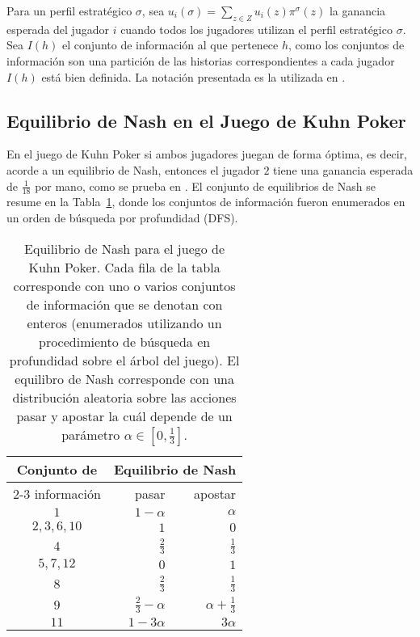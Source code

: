 Para un perfil estratégico $\sigma$, sea $u_i(\sigma) = \sum_{z \in Z} u_i(z)\pi^{\sigma}(z)$ la ganancia esperada del jugador $i$ cuando todos los jugadores utilizan el perfil estratégico $\sigma$. Sea $I(h)$ el conjunto de información al que pertenece $h$, como los conjuntos de información son una partición de las historias correspondientes a cada jugador $I(h)$ está bien definida. La notación presentada es la utilizada en \cite{bib:cfr}.

\subsection*{Equilibrio de Nash en el Juego de Kuhn Poker}

En el juego de Kuhn Poker si ambos jugadores juegan de forma óptima, es decir, acorde a un equilibrio de Nash, entonces el jugador $2$ tiene una ganancia esperada de $\frac{1}{18}$ por mano, como se prueba en \cite{bib:kuhn-poker}. El conjunto de equilibrios de Nash se resume en la Tabla~\ref{tab:estrategia-kuhn-poker}, donde los conjuntos de información fueron enumerados en un orden de búsqueda por profundidad (DFS).

\begin{table}[h]
\begin{center}
    \caption{Equilibrio de Nash para el juego de Kuhn Poker. Cada fila de la tabla corresponde con uno o varios conjuntos de información que se denotan con enteros (enumerados utilizando un procedimiento de búsqueda en profundidad sobre el árbol del juego). El equilibro de Nash corresponde con una distribución aleatoria sobre las acciones pasar y apostar la cuál depende de un parámetro $\alpha \in \left[ 0,\frac{1}{3} \right]$.}
    \label{tab:estrategia-kuhn-poker}
    \begin{tabular}{c r r}
        \toprule
        \multirow{2}{*}{Conjunto de} & \multicolumn{2}{c}{Equilibrio de Nash}  \\ \cmidrule(l){2-3}
        información & pasar & apostar \\ 
        \midrule
         $1$ & $1-\alpha$ & $\alpha$ \\
         $2, 3, 6, 10$ & $1$ & $0$ \\
         $4$ & $\frac{2}{3}$ & $\frac{1}{3}$ \\
         $5, 7, 12$ & $0$ & $1$ \\
         $8$ & $\frac{2}{3}$ & $\frac{1}{3}$ \\
         $9$ & $\frac{2}{3} - \alpha$ & $\alpha + \frac{1}{3}$ \\
        $11$ & $1 - 3 \alpha$ & $3 \alpha$ \\ \bottomrule
    \end{tabular}
\end{center}
\end{table}


